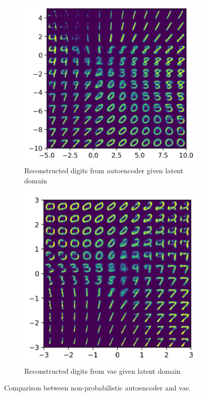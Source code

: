 \documentclass[../main.tex]{subfiles}
\begin{document}
\begin{figure}[H]
\begin{subfigure}[b]{0.49\textwidth}
		\centering
		\includegraphics[width=\textwidth]{imgs/relatedwork/ae-synth}
		\caption{Reconstructed digits from autoencoder given latent domain}
		\label{fig:five over x}
	\end{subfigure}
	\hfill
	\begin{subfigure}[b]{0.46\textwidth}
		\centering
		\includegraphics[width=\textwidth]{imgs/relatedwork/vae-synth}
		\caption{Reconstructed digits from \gls{vae} given latent domain}
		\label{fig:five over x}
	\end{subfigure}
	\caption{Comparison between non-probabilistic autoencoder and \gls{vae}.}
	\label{fig:three graphs}
\end{figure}
\end{document}
